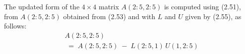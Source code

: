 The updated form of the $4\times 4$ matrix $A(2:5,2:5)$ is computed using (2.51),
from $A(2:5,2:5)$ obtained from (2.53) and with $L$ and $U$ given by (2.55), as
follows:
\begin{align*}
& A(2:5,2:5)\\
& \;=\; A(2:5,2:5) \;-\; L(2:5,1)\, U(1,2:5)
\end{align*}
